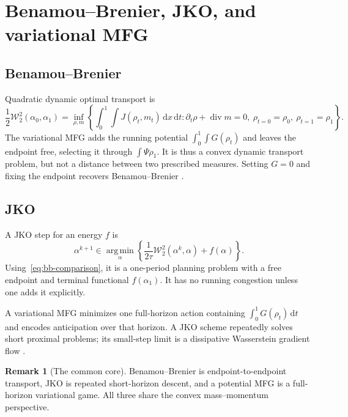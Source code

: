 \documentclass[11pt,a4paper]{article}
\theoremstyle{definition}
\newtheorem{remark}[theorem]{Remark}
\newcommand{\Wass}{\mathcal W}
\newcommand{\argmin}{\operatorname*{arg\,min}}
\newcommand{\diverg}{\operatorname{div}}
\newcommand{\dd}{\,\mathrm d}
\newcommand{\al}{\alpha}
\begin{document}
\section{Benamou--Brenier, JKO, and variational MFG}

\subsection{Benamou--Brenier}

Quadratic dynamic optimal transport is
\begin{equation}\label{eq:bb-comparison}
  \frac12\Wass_2^2(\al_0,\al_1)
  =
  \inf_{\rho,m}
  \left\{
    \int_0^1\!\int J(\rho_t,m_t)\dd x\dd t:
    \partial_t\rho+\diverg m=0,\
    \rho_{t=0}=\rho_0,\
    \rho_{t=1}=\rho_1
  \right\}.
\end{equation}
The variational MFG adds the running potential
\(\int_0^1\int G(\rho_t)\) and leaves the endpoint free, selecting it through
\(\int\Psi\rho_1\). It is thus a convex dynamic transport problem, but not a
distance between two prescribed measures. Setting \(G=0\) and fixing the
endpoint recovers Benamou--Brenier \citep{BenamouBrenier2000}.

\subsection{JKO}

A JKO step for an energy \(f\) is
\begin{equation}\label{eq:jko-comparison}
  \al^{k+1}\in\argmin_{\al}
  \left\{
    \frac1{2\tau}\Wass_2^2(\al^k,\al)+f(\al)
  \right\}.
\end{equation}
Using~\eqref{eq:bb-comparison}, it is a one-period planning problem with a
free endpoint and terminal functional \(f(\al_1)\). It has no running
congestion unless one adds it explicitly.

A variational MFG minimizes one full-horizon action containing
\(\int_0^1G(\rho_t)\dd t\) and encodes anticipation over that horizon. A JKO
scheme repeatedly solves short proximal problems; its small-step limit is a
dissipative Wasserstein gradient flow
\citep{JordanKinderlehrerOtto1998,AmbrosioGigliSavare2008}.

\begin{remark}[The common core]
Benamou--Brenier is endpoint-to-endpoint transport, JKO is repeated
short-horizon descent, and a potential MFG is a full-horizon variational game.
All three share the convex mass--momentum perspective.
\end{remark}
\end{document}
